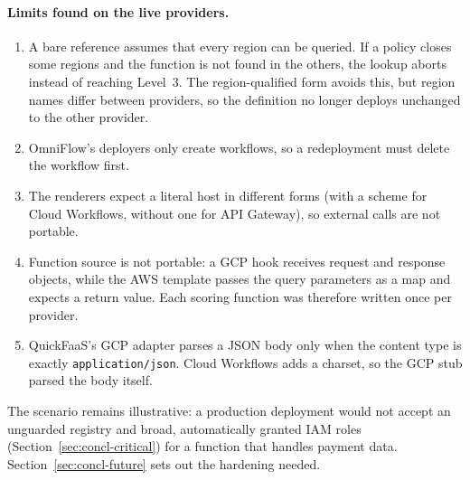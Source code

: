 \paragraph{Limits found on the live providers.}
\begin{enumerate}
  \item A bare reference assumes that every region can be queried. If a policy closes some
  regions and the function is not found in the others, the lookup aborts instead of reaching
  Level~3. The region-qualified form avoids this, but region names differ between providers, so
  the definition no longer deploys unchanged to the other provider.
  \item OmniFlow's deployers only create workflows, so a redeployment must delete the workflow
  first.
  \item The renderers expect a literal host in different forms (with a scheme for Cloud Workflows,
  without one for API Gateway), so external calls are not portable.
  \item Function source is not portable: a GCP hook receives request and response objects, while
  the AWS template passes the query parameters as a map and expects a return value. Each scoring
  function was therefore written once per provider.
  \item QuickFaaS's GCP adapter parses a JSON body only when the content type is exactly
  \texttt{application/\allowbreak json}. Cloud Workflows adds a charset, so the GCP stub parsed
  the body itself.
\end{enumerate}

The scenario remains illustrative: a production deployment would not accept an unguarded
registry and broad, automatically granted IAM roles (Section~\ref{sec:concl-critical}) for a
function that handles payment data. Section~\ref{sec:concl-future} sets out the hardening needed.
